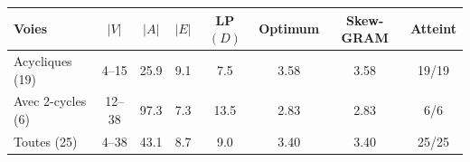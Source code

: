 \setlength{\tabcolsep}{5pt}
\begin{tabular}{@{}l c S[table-format=2.1] S[table-format=1.1] S[table-format=2.1] S[table-format=1.2] S[table-format=1.2] c@{}}
\toprule
Voies & $|V|$ & {$|A|$} & {$|E|$} & {LP$(D)$} & {Optimum} & {Skew-GRAM} & Atteint \\
\midrule
Acycliques (19) & 4--15 & 25.9 & 9.1 & 7.5 & 3.58 & 3.58 & 19/19 \\
Avec 2-cycles (6) & 12--38 & 97.3 & 7.3 & 13.5 & 2.83 & 2.83 & 6/6 \\
\midrule
Toutes (25) & 4--38 & 43.1 & 8.7 & 9.0 & 3.40 & 3.40 & 25/25 \\
\bottomrule
\end{tabular}
